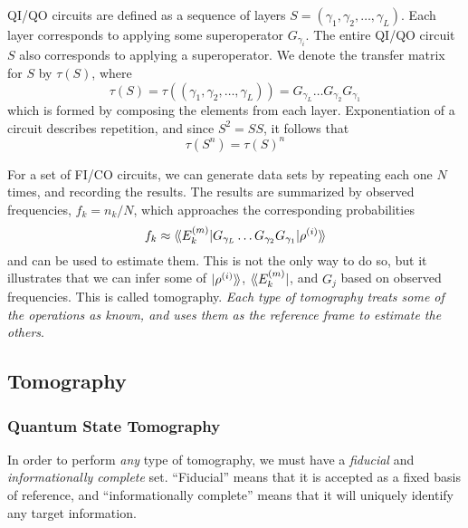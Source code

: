 QI/QO circuits are defined as a sequence of layers $S = (\gamma_1, \gamma_2, \dots, \gamma_L)$. Each
layer corresponds to applying some superoperator $G_{\gamma_i}$. The entire QI/QO circuit $S$ also
corresponds to applying a superoperator. We denote the transfer matrix for $S$ by $\tau(S)$, where
\begin{equation}
    \tau(S) = \tau((\gamma_1, \gamma_2, \dots, \gamma_L)) = G_{\gamma_L} \dots G_{\gamma_2} G_{\gamma_1}
\end{equation}
which is formed by composing the elements from each layer. Exponentiation of a circuit describes
repetition, and since $S^2 = SS$, it follows that
\begin{equation}
    \tau(S^n) = \tau(S)^n
\end{equation}

For a set of FI/CO circuits, we can generate data sets by repeating each one $N$ times, and
recording the results. The results are summarized by observed frequencies, $f_k = n_k / N$, which
approaches the corresponding probabilities
\begin{equation}
    f_k \approx \langle\!\braket{E_k^{(m)} | G_{\gamma_L} \dots G_{\gamma_2} G_{\gamma_1} | \rho^{(i)}}\!\rangle
\end{equation}
and can be used to estimate them. This is not the only way to do so, but it illustrates that we can
infer some of $\ket{\rho^{(i)}}\!\rangle$, $\langle\!\bra{E_k^{(m)}}$, and $G_j$ based on observed
frequencies. This is called tomography. \textit{Each type of tomography treats some of the
operations as known, and uses them as the reference frame to estimate the others}.

\subsection{Tomography}

\subsubsection{Quantum State Tomography}

In order to perform \textit{any} type of tomography, we must have a \textit{fiducial} and
\textit{informationally complete} set. ``Fiducial'' means that it is accepted as a fixed basis of
reference, and ``informationally complete'' means that it will uniquely identify any target
information. 

